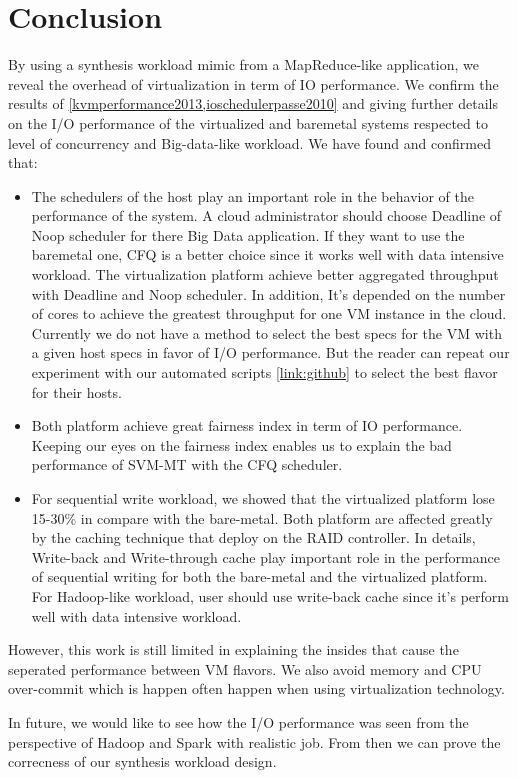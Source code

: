 \documentclass{acmsig}
\begin{document}
\section{Conclusion}
By using a synthesis workload mimic from a MapReduce-like application, we reveal the overhead of virtualization in term of IO performance. We confirm the results of \ref{kvmperformance2013,ioschedulerpasse2010} and giving further details on the I/O performance of the virtualized and baremetal systems respected to level of concurrency and Big-data-like workload. We have found and confirmed that:
\begin{itemize}
  \item The schedulers of the host play an important role in the behavior of the performance of the system. A cloud administrator should choose Deadline of Noop scheduler for there Big Data application. If they want to use the baremetal one, CFQ is a better choice since it works well with data intensive workload. The virtualization platform achieve better aggregated throughput with Deadline and Noop scheduler. In addition, It's depended on the number of cores to achieve the greatest throughput for one VM instance in the cloud. Currently we do not have a method to select the best specs for the VM with a given host specs in favor of I/O performance. But the reader can repeat our experiment with our automated scripts \ref{link:github} to select the best flavor for their hosts.
  \item Both platform achieve great fairness index in term of IO performance. Keeping our eyes on the fairness index enables us to explain the bad performance of SVM-MT with the CFQ scheduler.
  \item For sequential write workload, we showed that the virtualized platform lose 15-30\% in compare with the bare-metal. Both platform are affected greatly by the caching technique that deploy on the RAID controller. In details, Write-back and Write-through cache play important role in the performance of sequential writing for both the bare-metal and the virtualized platform. For Hadoop-like workload, user should use write-back cache since it's perform well with data intensive workload.
\end{itemize}
However, this work is still limited in explaining the insides that cause the seperated performance between VM flavors. We also avoid memory and CPU over-commit which is happen often happen when using virtualization technology.

In future, we would like to see how the I/O performance was seen from the perspective of Hadoop and Spark with realistic job. From then we can prove the correcness of our synthesis workload design.




% 
% 
\end{document}
